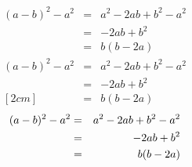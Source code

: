 \documentclass[12pt]{article}
\begin{document}
\LARGE
\begin{eqnarray}
(a-b)^2-a^2&=&a^2-2ab+b^2-a^2\\
           &=&-2ab+b^2\\
           &=&b(b-2a)
\end{eqnarray}
\begin{eqnarray*}
(a-b)^2-a^2&=&a^2-2ab+b^2-a^2\\
           &=&-2ab+b^2\\ [2cm]
           &=&b(b-2a)
\end{eqnarray*}
\begin{eqnarray}
(a-b)^2-a^2&=&a^2-2ab+b^2-a^2\\
           &=&-2ab+b^2 \notag \\
           &=&b(b-2a)
\end{eqnarray}
\end{document}
